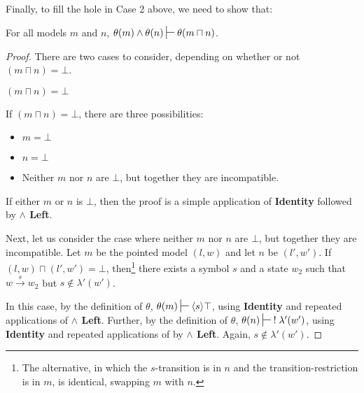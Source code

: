 Finally, to fill the hole in Case 2 above, we need to show that:
\begin{lemma}
For all models $m$ and $n$, $\theta(m) \land \theta(n) \judge \theta (m \sqcap n)$.
\end{lemma}

\begin{proof}

There are two cases to consider, depending on whether or not $(m \sqcap n) = \bot$.

\setcounter{mycase}{0}

\begin{mycase}
$(m \sqcap n) = \bot$
\end{mycase}
If $(m \sqcap n) = \bot$, there are three possibilities:
\begin{itemize}
\item
$m = \bot$
\item
$n = \bot$
\item
Neither $m$ nor $n$ are $\bot$, but together they are incompatible. 
\end{itemize}
If either $m$ or $n$ is $\bot$, then the proof is a simple application of {\bf Identity} followed by {\bf $\land$ Left}.

Next, let us consider the case where neither $m$ nor $n$ are $\bot$, but together they are incompatible.
Let $m$ be the pointed model $(l, w)$ and let $n$ be $(l', w')$.
If $(l, w) \sqcap (l', w') = \bot$, then\footnote{The alternative, in which the $s$-transition is in $n$ and the transition-restriction is in $m$, is identical, swapping $m$ with $n$.} there exists a symbol $s$ and a state $w_2$ such that $w \xrightarrow{s} w_2$ but $s \notin \lambda'(w')$.

In this case, by the definition of $\theta$, $\theta(m) \judge \langle s \rangle \top$, using  {\bf Identity} and repeated applications of {\bf $\land$ Left}.
Further, by the definition of $\theta$, $\theta(n) \judge \; ! \; \lambda'(w')$, using  {\bf Identity} and repeated applications of by {\bf $\land$ Left}. Again, $s \notin  \lambda'(w')$.


\end{proof}
